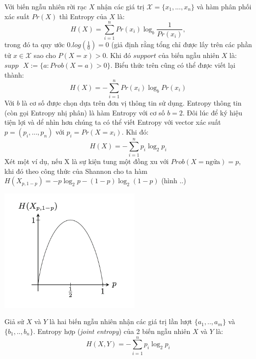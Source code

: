 \documentclass[a4paper, 12pt]{report}
\begin{document}
Với biến ngẫu nhiên rời rạc  $X$ nhận các giá trị $\mathscr{X}=\{x_{1},...,x_{n}\}$ và hàm phân phối xác suất $Pr(X)$ thì Entropy của $X$ là:
\begin{equation*}
H(X) = \displaystyle \sum_{i=1}^{n}Pr(x_i)\log_{b}\frac{1}{Pr(x_i)},
\end{equation*}
trong đó ta quy ước $0.log(\frac{1}{0}) = 0$ (giả định rằng tổng chỉ được lấy trên các phần tử $x \in \mathscr{X}$ sao cho $P(X=x)>0$. Khi đó $support$ của biến ngẫu nhiên $X$ là: $supp\textrm{ }X := \{a: Prob(X=a) > 0\}$. Biểu thức trên cũng có thể được viết lại thành: 
\begin{equation*}
H(X) = -\displaystyle \sum_{i=1}^{n}Pr(x_i)\log_{b}Pr(x_i)
\end{equation*}
Với $b$ là cơ số được chọn dựa trên đơn vị thông tin sử dụng. Entropy thông tin (còn gọi Entropy nhị phân) là hàm Entropy với cơ số $b=2$.
Đôi lúc để ký hiệu tiện lợi và dể nhìn hơn chúng ta có thể viết Entropy với vector xác suất $p=(p_i,...,p_n)$ với $p_i = Pr(X=x_i)$. Khi đó:
\begin{equation*}
H(X) = -\displaystyle \sum_{i=1}^{n}p_i\log_{2}p_i
\end{equation*}
Xét một ví dụ, nếu X là sự kiện tung một đồng xu với $Prob(X = \textrm{ngửa}) = p$, khi đó theo công thức của Shannon cho ta hàm $H(X_{p,1-p}) = -p\log_{2}p-(1-p)\log_{2}(1-p)$ (hình ..)
\begin{center}
	\includegraphics[width=7cm]{funcEntropy}\\
\end{center}

Giả sử $X$ và $Y$ là hai biến ngẫu nhiên nhận các giá trị lần lượt $\{a_1,..,a_m\}$ và $\{b_1,..,b_n\}$. Entropy hợp (\textit{joint entropy}) của 2 biến ngẫu nhiên $X$ và $Y$ là:
\begin{equation*}
H(X,Y) = -\displaystyle \sum_{i=1}^{n}p_i\log_{2}p_i
\end{equation*}
\end{document}
